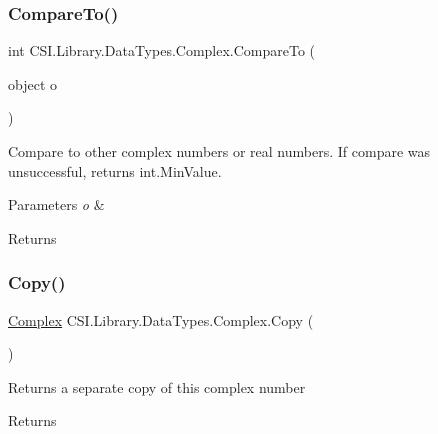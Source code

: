\subsubsection{\texorpdfstring{CompareTo()}{CompareTo()}}
{\footnotesize\ttfamily int C\+S\+I.\+Library.\+Data\+Types.\+Complex.\+Compare\+To (\begin{DoxyParamCaption}\item[{object}]{o }\end{DoxyParamCaption})\hspace{0.3cm}{\ttfamily [inline]}}



Compare to other complex numbers or real numbers. If compare was unsuccessful, returns int.\+Min\+Value. 


\begin{DoxyParams}{Parameters}
{\em o} & \\
\hline
\end{DoxyParams}
\begin{DoxyReturn}{Returns}

\end{DoxyReturn}
\mbox{\label{struct_c_s_i_1_1_library_1_1_data_types_1_1_complex_acfabccfac87216495a13aa8bff5f1dd3}} 
\subsubsection{\texorpdfstring{Copy()}{Copy()}\hspace{0.1cm}{\footnotesize\ttfamily [1/2]}}
{\footnotesize\ttfamily \mbox{\hyperlink{struct_c_s_i_1_1_library_1_1_data_types_1_1_complex}{Complex}} C\+S\+I.\+Library.\+Data\+Types.\+Complex.\+Copy (\begin{DoxyParamCaption}{ }\end{DoxyParamCaption})\hspace{0.3cm}{\ttfamily [inline]}}



Returns a separate copy of this complex number 

\begin{DoxyReturn}{Returns}

\end{DoxyReturn}
\mbox{\label{struct_c_s_i_1_1_library_1_1_data_types_1_1_complex_a9b5f9e9903acb5696a08df8171b51b6c}} 
